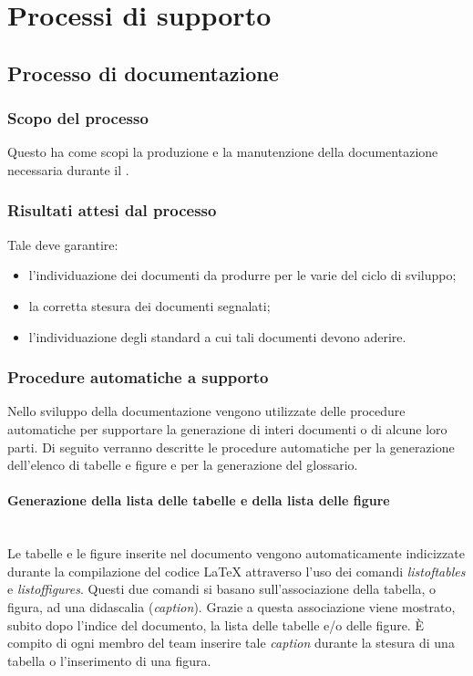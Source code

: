 \section{Processi di supporto}
\subsection{Processo di documentazione}


\subsubsection{Scopo del processo}
Questo  ha come scopi la produzione e la manutenzione della documentazione necessaria durante il .
\subsubsection{Risultati attesi dal processo}
Tale  deve garantire:
\begin{itemize}
\item l'individuazione dei documenti da produrre per le varie  del ciclo di sviluppo;
\item la corretta stesura dei documenti segnalati;
\item l'individuazione degli standard a cui tali documenti devono aderire.
\end{itemize}

\subsubsection{Procedure automatiche a supporto}
Nello sviluppo della documentazione vengono utilizzate delle procedure automatiche per supportare la generazione di interi documenti o di alcune loro parti. Di seguito verranno descritte le procedure automatiche per la generazione dell'elenco di tabelle e figure e per la generazione del glossario.
\paragraph{Generazione della lista delle tabelle e della lista delle figure} \mbox{} \\
Le tabelle e le figure inserite nel documento vengono automaticamente indicizzate durante la compilazione del codice \LaTeX{} attraverso l'uso dei comandi \textit{listoftables} e \textit{listoffigures}. Questi due comandi si basano sull'associazione della tabella, o figura, ad una didascalia (\textit{caption}). Grazie a questa associazione viene mostrato, subito dopo l'indice del documento, la lista delle tabelle e/o delle figure. È compito di ogni membro del team inserire tale \textit{caption} durante la stesura di una tabella o l'inserimento di una figura.

